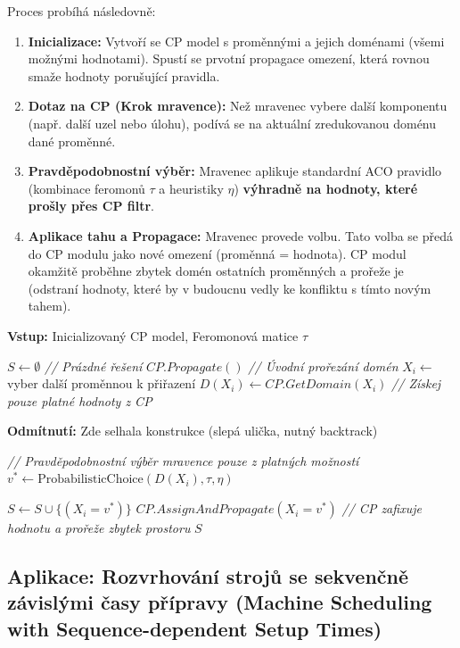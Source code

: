 \documentclass[12pt,a4paper]{article}
\theoremstyle{definition}
\begin{document}
Proces probíhá následovně:
\begin{enumerate}
    \item \textbf{Inicializace:} Vytvoří se CP model s proměnnými a jejich doménami (všemi možnými hodnotami). Spustí se prvotní propagace omezení, která rovnou smaže hodnoty porušující pravidla.
    \item \textbf{Dotaz na CP (Krok mravence):} Než mravenec vybere další komponentu (např. další uzel nebo úlohu), podívá se na aktuální zredukovanou doménu dané proměnné.
    \item \textbf{Pravděpodobnostní výběr:} Mravenec aplikuje standardní ACO pravidlo (kombinace feromonů $\tau$ a heuristiky $\eta$) \textbf{výhradně na hodnoty, které prošly přes CP filtr}.
    \item \textbf{Aplikace tahu a Propagace:} Mravenec provede volbu. Tato volba se předá do CP modulu jako nové omezení (proměnná = hodnota). CP modul okamžitě proběhne zbytek domén ostatních proměnných a prořeže je (odstraní hodnoty, které by v budoucnu vedly ke konfliktu s tímto novým tahem).
\end{enumerate}

\begin{algorithm}[H]
\caption{ACO + CP Integrace (Konstrukce řešení mravencem)}
\textbf{Vstup:} Inicializovaný CP model, Feromonová matice $\tau$
\begin{algorithmic}[1]
\STATE $S \gets \emptyset$ \textit{// Prázdné řešení}
\STATE $CP.Propagate()$ \textit{// Úvodní prořezání domén}
    \STATE $X_i \gets$ vyber další proměnnou k přiřazení
    \STATE $D(X_i) \gets CP.GetDomain(X_i)$ \textit{// Získej pouze platné hodnoty z CP}
    
        \STATE \textbf{Odmítnutí:} Zde selhala konstrukce (slepá ulička, nutný backtrack)
        \RETURN {}
    \ENDIF
    
    \STATE \textit{// Pravděpodobnostní výběr mravence pouze z platných možností}
    \STATE $v^* \gets \text{ProbabilisticChoice}(D(X_i), \tau, \eta)$ 
    
    \STATE $S \gets S \cup \{(X_i = v^*)\}$
    \STATE $CP.AssignAndPropagate(X_i = v^*)$ \textit{// CP zafixuje hodnotu a prořeže zbytek prostoru}
\ENDWHILE
\RETURN $S$
\end{algorithmic}
\end{algorithm}

\subsection{Aplikace: Rozvrhování strojů se sekvenčně závislými časy přípravy (Machine Scheduling with Sequence-dependent Setup Times)}
\end{document}
